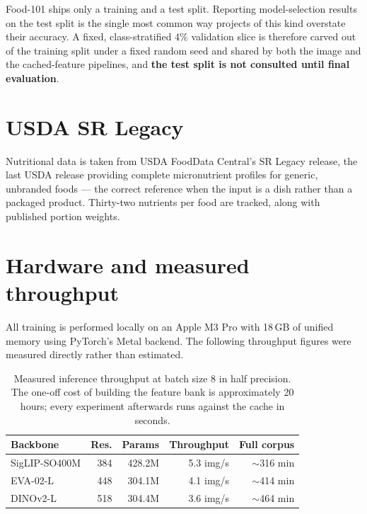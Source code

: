 \documentclass[12pt,a4paper,oneside]{report}
\begin{document}
Food-101 ships only a training and a test split. Reporting model-selection
results on the test split is the single most common way projects of this kind
overstate their accuracy. A fixed, class-stratified 4\% validation slice is
therefore carved out of the training split under a fixed random seed and shared
by both the image and the cached-feature pipelines, and \textbf{the test split is
not consulted until final evaluation}.

\section{USDA SR Legacy}

Nutritional data is taken from USDA FoodData Central's SR Legacy release, the
last USDA release providing complete micronutrient profiles for generic,
unbranded foods --- the correct reference when the input is a dish rather than a
packaged product. Thirty-two nutrients per food are tracked, along with
published portion weights.

\section{Hardware and measured throughput}

All training is performed locally on an Apple M3 Pro with 18\,GB of unified
memory using PyTorch's Metal backend. The following throughput figures were
measured directly rather than estimated.

\begin{table}[h]
\centering
\begin{tabular}{lrrrr}
\toprule
\textbf{Backbone} & \textbf{Res.} & \textbf{Params} & \textbf{Throughput} & \textbf{Full corpus} \\
\midrule
SigLIP-SO400M & 384 & 428.2M & 5.3 img/s & $\sim$316 min \\
EVA-02-L      & 448 & 304.1M & 4.1 img/s & $\sim$414 min \\
DINOv2-L      & 518 & 304.4M & 3.6 img/s & $\sim$464 min \\
\bottomrule
\end{tabular}
\caption{Measured inference throughput at batch size 8 in half precision. The
one-off cost of building the feature bank is approximately 20 hours; every
experiment afterwards runs against the cache in seconds.}
\end{table}

\end{document}
